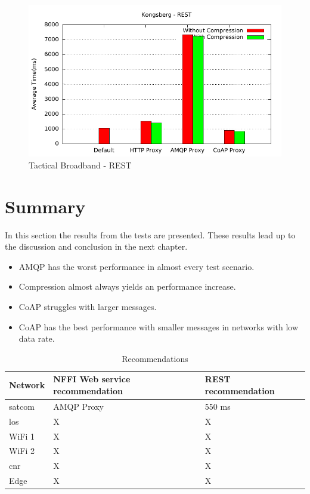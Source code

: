 \begin{figure}[H]
\center
\includegraphics[scale=0.75]{../results/kongsberg/rest/out.pdf}
\caption{Tactical Broadband - REST}
\end{figure}



\section{Summary}

In this section the results from the tests are presented. These results lead up
to the discussion and conclusion in the next chapter.

\begin{itemize}
\item AMQP has the worst performance in almost every test scenario.
\item Compression almost always yields an performance increase.
\item CoAP struggles with larger messages.
\item CoAP has the best performance with smaller messages in networks with low data rate.
\end{itemize}

\begin{table}[h]
\begin{tabular}{| l | l | l |}
\hline
  \textbf{Network} & \textbf{NFFI Web service recommendation} & \textbf{REST recommendation}\\ \hline
  \gls{satcom} & AMQP Proxy & 550 ms \\ \hline
  \gls{los} & X & X\\ \hline
  WiFi 1 & X & X \\ \hline
  WiFi 2 & X & X \\ \hline
  \gls{cnr} & X & X \\ \hline
  Edge & X & X\\ \hline
\end{tabular}
\caption{Recommendations}
\label{table-evaluation-summary}
\end{table}
